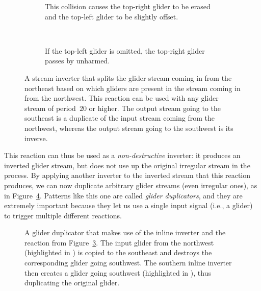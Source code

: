 \begin{figure}[!htb]
	\centering
	\begin{subfigure}{.48\textwidth}
		\centering
		\caption{This collision causes the top-right glider to be erased and the top-left glider to be slightly offset.}
		\label{fig:stream_inverter_yes}
	\end{subfigure} \ \ \ \ %
	\begin{subfigure}{.48\textwidth}
		\centering
		\caption{If the top-left glider is omitted, the top-right glider passes by unharmed.}
		\label{fig:stream_inverter_no}
	\end{subfigure}
	\caption{A stream inverter that splits the glider stream coming in from the northeast based on which gliders are present in the stream coming in from the northwest. This reaction can be used with any glider stream of period~$20$ or higher. The output stream going to the southeast is a duplicate of the input stream coming from the northwest, whereas the output stream going to the southwest is its inverse.}\label{fig:stream_inverter}
\end{figure}

This reaction can thus be used as a \emph{non-destructive} inverter: it produces an inverted glider stream, but does not use up the original irregular stream in the process. By applying another inverter to the inverted stream that this reaction produces, we can now duplicate arbitrary glider streams (even irregular ones), as in Figure~\ref{fig:periodic_glider_duplicator}. Patterns like this one are called \emph{glider duplicators}, and they are extremely important because they let us use a single input signal (i.e., a glider) to trigger multiple different reactions.

\begin{figure}[!htb]
	\centering
	\caption{A glider duplicator that makes use of the inline inverter and the reaction from Figure~\ref{fig:stream_inverter}. The input glider from the northwest (highlighted in ) is copied to the southeast and destroys the corresponding glider going southwest. The southern inline inverter then creates a glider going southwest (highlighted in ), thus duplicating the original glider.}\label{fig:periodic_glider_duplicator}
\end{figure}


